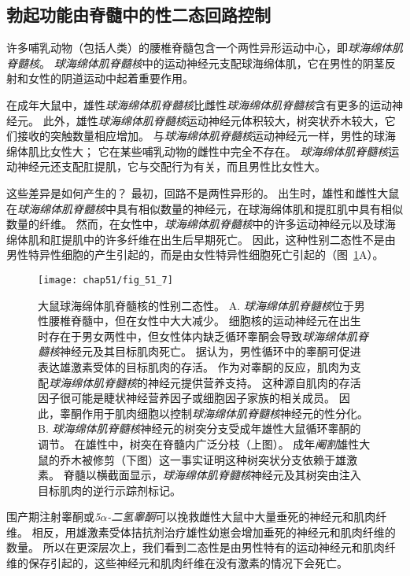 \subsection{勃起功能由脊髓中的性二态回路控制}

许多哺乳动物（包括人类）的腰椎脊髓包含一个两性异形运动中心，即\textit{球海绵体肌脊髓核}。
\textit{球海绵体肌脊髓核}中的运动神经元支配球海绵体肌，它在男性的阴茎反射和女性的阴道运动中起着重要作用。


在成年大鼠中，雄性\textit{球海绵体肌脊髓核}比雌性\textit{球海绵体肌脊髓核}含有更多的运动神经元。
此外，雄性\textit{球海绵体肌脊髓核}运动神经元体积较大，树突状乔木较大，它们接收的突触数量相应增加。
与\textit{球海绵体肌脊髓核}运动神经元一样，男性的球海绵体肌比女性大；
它在某些哺乳动物的雌性中完全不存在。
\textit{球海绵体肌脊髓核}运动神经元还支配肛提肌，它与交配行为有关，而且男性比女性大。


这些差异是如何产生的？
最初，回路不是两性异形的。
出生时，雄性和雌性大鼠在\textit{球海绵体肌脊髓核}中具有相似数量的神经元，在球海绵体肌和提肛肌中具有相似数量的纤维。
然而，在女性中，\textit{球海绵体肌脊髓核}中的许多运动神经元以及球海绵体肌和肛提肌中的许多纤维在出生后早期死亡。
因此，这种性别二态性不是由男性特异性细胞的产生引起的，而是由女性特异性细胞死亡引起的（图~\ref{fig:51_7}A）。


\begin{figure}[htbp]
	\centering
	\texttt{[image: chap51/fig\_51\_7]}
	\caption{大鼠球海绵体肌脊髓核的性别二态性。
		A. \textit{球海绵体肌脊髓核}位于男性腰椎脊髓中，但在女性中大大减少。
		细胞核的运动神经元在出生时存在于男女两性中，但女性体内缺乏循环睾酮会导致\textit{球海绵体肌脊髓核}神经元及其目标肌肉死亡。
		据认为，男性循环中的睾酮可促进表达雄激素受体的目标肌肉的存活。
		作为对睾酮的反应，肌肉为支配\textit{球海绵体肌脊髓核}的神经元提供营养支持。
		这种源自肌肉的存活因子很可能是睫状神经营养因子或细胞因子家族的相关成员。
		因此，睾酮作用于肌肉细胞以控制\textit{球海绵体肌脊髓核}神经元的性分化\cite{morris2004sexual}。
		B. \textit{球海绵体肌脊髓核}神经元的树突分支受成年雄性大鼠循环睾酮的调节。
		在雄性中，树突在脊髓内广泛分枝（上图）。
		成年\textit{阉割}雄性大鼠的乔木被修剪（下图）这一事实证明这种树突状分支依赖于雄激素。
		脊髓以横截面显示，\textit{球海绵体肌脊髓核}神经元及其树突由注入目标肌肉的逆行示踪剂标记\cite{cooke2005gonadal}。}
	\label{fig:51_7}
\end{figure}


围产期注射睾酮或\textit{5$\alpha$-二氢睾酮}可以挽救雌性大鼠中大量垂死的神经元和肌肉纤维。
相反，用雄激素受体拮抗剂治疗雄性幼崽会增加垂死的神经元和肌肉纤维的数量。
所以在更深层次上，我们看到二态性是由男性特有的运动神经元和肌肉纤维的保存引起的，这些神经元和肌肉纤维在没有激素的情况下会死亡。


